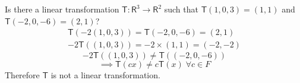 Is there a linear transformation $\mathsf{T}\colon\mathsf{R}^3 \to
\mathsf{R}^2$ such that $\mathsf{T}(1,0,3) = (1,1)$ and
$\mathsf{T}(-2,0,-6) = (2,1)$?
\begin{align}
\mathsf{T}(-2(1,0,3)) = \mathsf{T}(-2,0,-6) = (2,1)\\
-2\mathsf{T}((1,0,3)) = -2 \times (1,1) = (-2,-2)
\end{align}
\begin{equation}
-2\mathsf{T}((1,0,3)) \neq \mathsf{T}((-2,0,-6))
\end{equation}
\begin{equation}
\implies \mathsf{T}(cx) \neq c\mathsf{T}(x)\;\forall c\in F
\end{equation}
Therefore $\mathsf{T}$ is not a linear transformation.
